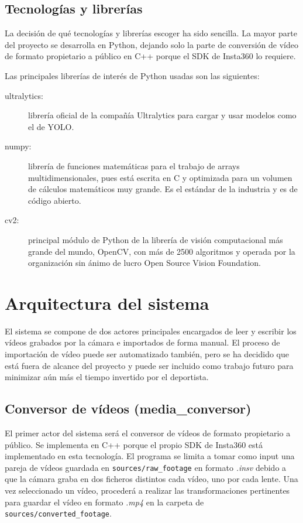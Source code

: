\subsection{Tecnologías y librerías}

La decisión de qué tecnologías y librerías escoger ha sido sencilla. La mayor parte del proyecto se desarrolla en Python, dejando solo la parte de conversión de vídeo de formato propietario a público en C++ porque el SDK de Insta360 lo requiere.

Las principales librerías de interés de Python usadas son las siguientes:
\begin{description}
	\item[ultralytics:] librería oficial de la compañía Ultralytics para cargar y usar modelos como el de YOLO.
	\item[numpy:] librería de funciones matemáticas para el trabajo de arrays multidimensionales, pues está escrita en C y optimizada para un volumen de cálculos matemáticos muy grande. Es el estándar de la industria y es de código abierto.
	\item[cv2:] principal módulo de Python de la librería de visión computacional más grande del mundo, OpenCV, con más de 2500 algoritmos y operada por la organización sin ánimo de lucro Open Source Vision Foundation.
\end{description}


\section[Arquitectura]{Arquitectura del sistema}
El sistema se compone de dos actores principales encargados de leer y escribir los vídeos grabados por la cámara e importados de forma manual. El proceso de importación de vídeo puede ser automatizado también, pero se ha decidido que está fuera de alcance del proyecto y puede ser incluido como trabajo futuro para minimizar aún más el tiempo invertido por el deportista.
\vspace{20px}

\subsection{Conversor de vídeos (media\_conversor)}
El primer actor del sistema será el conversor de vídeos de formato propietario a público. Se implementa en C++ porque el propio SDK de Insta360 está implementado en esta tecnología. El programa se limita a tomar como input una pareja de vídeos guardada en \verb|sources/raw_footage| en formato \textit{.insv} debido a que la cámara graba en dos ficheros distintos cada vídeo, uno por cada lente. Una vez seleccionado un vídeo, procederá a realizar las transformaciones pertinentes para guardar el vídeo en formato \textit{.mp4} en la carpeta de \verb|sources/converted_footage|.

